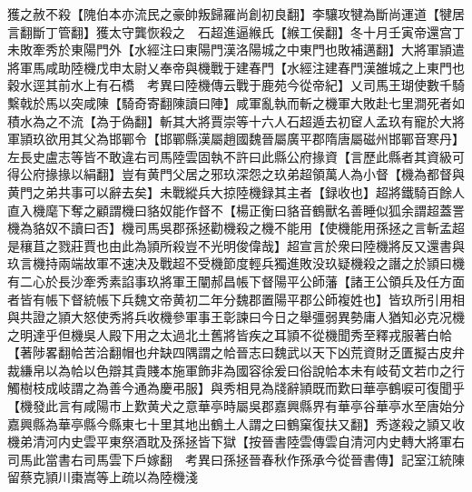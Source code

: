 獲之赦不殺【隗伯本亦流民之豪帥叛歸羅尚創初良翻】李驤攻犍為斷尚運道【犍居言翻斷丁管翻】獲太守龔恢殺之　石超進逼緱氏【緱工侯翻】冬十月壬寅帝還宫丁未敗牽秀於東陽門外【水經注曰東陽門漢洛陽城之中東門也敗補邁翻】大將軍頴遣將軍馬咸助陸機戊申太尉乂奉帝與機戰于建春門【水經注建春門漢雒城之上東門也穀水逕其前水上有石橋　考異曰陸機傳云戰于鹿苑今從帝紀】乂司馬王瑚使數千騎繫戟於馬以突咸陳【騎奇寄翻陳讀曰陣】咸軍亂執而斬之機軍大敗赴七里澗死者如積水為之不流【為于偽翻】斬其大將賈崇等十六人石超遁去初䆠人孟玖有寵於大將軍頴玖欲用其父為邯鄲令【邯鄲縣漢屬趙國魏晉屬廣平郡隋唐屬磁州邯鄲音寒丹】左長史盧志等皆不敢違右司馬陸雲固執不許曰此縣公府掾資【言歷此縣者其資級可得公府掾掾以絹翻】豈有黄門父居之邪玖深怨之玖弟超領萬人為小督【機為都督與黄門之弟共事可以辭去矣】未戰縱兵大掠陸機録其主者【録收也】超將鐵騎百餘人直入機麾下奪之顧謂機曰貉奴能作督不【楊正衡曰貉音鶴獸名善睡似狐余謂超蓋詈機為貉奴不讀曰否】機司馬吳郡孫拯勸機殺之機不能用【使機能用孫拯之言斬孟超是穰苴之戮莊賈也由此為頴所殺豈不光明俊偉哉】超宣言於衆曰陸機將反又還書與玖言機持兩端故軍不速决及戰超不受機節度輕兵獨進敗没玖疑機殺之譖之於頴曰機有二心於長沙牽秀素諂事玖將軍王闡郝昌帳下督陽平公師藩【諸王公領兵及任方面者皆有帳下督統帳下兵魏文帝黄初二年分魏郡置陽平郡公師複姓也】皆玖所引用相與共證之頴大怒使秀將兵收機參軍事王彰諫曰今日之舉彊弱異勢庸人猶知必克况機之明達乎但機吳人殿下用之太過北土舊將皆疾之耳頴不從機聞秀至釋戎服著白帢【著陟畧翻帢苦洽翻帽也弁缺四隅謂之帢晉志曰魏武以天下凶荒資財乏匱擬古皮弁裁縑帛以為帢以色辯其貴賤本施軍飾非為國容徐爰曰俗說帢本未有岐荀文若巾之行觸樹枝成岐謂之為善今通為慶弔服】與秀相見為牋辭頴既而歎曰華亭鶴唳可復聞乎【機發此言有咸陽市上歎黄犬之意華亭時屬吳郡嘉興縣界有華亭谷華亭水至唐始分嘉興縣為華亭縣今縣東七十里其地出鶴土人謂之曰鶴窠復扶又翻】秀遂殺之頴又收機弟清河内史雲平東祭酒耽及孫拯皆下獄【按晉書陸雲傳雲自清河内史轉大將軍右司馬此當書右司馬雲下戶嫁翻　考異曰孫拯晉春秋作孫承今從晉書傳】記室江統陳留蔡克頴川棗嵩等上疏以為陸機淺

